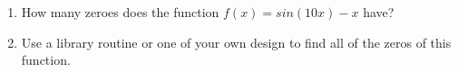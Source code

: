 \documentclass{jhwhw}
\begin{document}
\begin{enumerate}
	\item How many zeroes does the function
		\(
			f(x) = sin(10x) - x
		\)
		have?
	\item Use a library routine or one of your own design to find all of the zeros of this function.
\end{enumerate}
\end{document}

